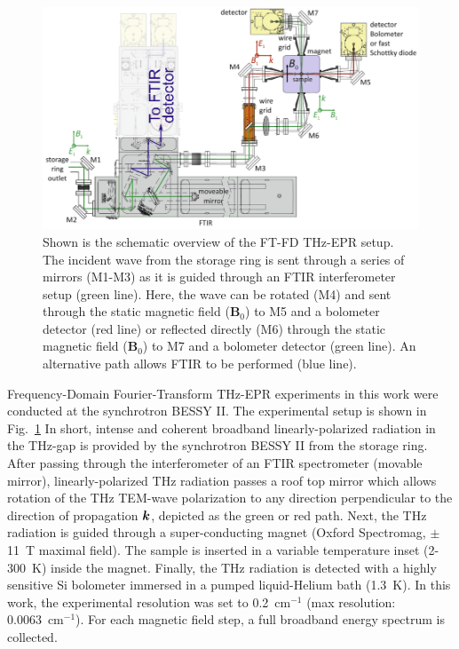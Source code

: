 \begin{figure}[htpb]
\centering
  \includegraphics{Kapitel/Ch4-Images/Ch4-ExperimentSetup.eps}%
  \caption[Schematic Overview of FT-FD THz-EPR setup.]{Shown is the schematic overview of the FT-FD THz-EPR setup. The incident wave from the storage ring is sent through a series of mirrors (M1-M3) as it is guided through an FTIR interferometer setup (green line). Here, the wave can be rotated (M4) and sent through the static magnetic field (\textbf{B}$_0$) to M5 and a bolometer detector (red line) or reflected directly (M6) through the static magnetic field (\textbf{B}$_0$) to M7 and a bolometer detector (green line). An alternative path allows FTIR to be performed (blue line).}
  \label{ch4-fig:ExFDFTSetup}
\end{figure}

Frequency-Domain Fourier-Transform THz-EPR experiments in this work were conducted at the synchrotron BESSY II. The experimental setup is shown in Fig.~\ref{ch4-fig:ExFDFTSetup} \cite{Schnegg09,Nehrkorn13,NEHRKORN201710} In short, intense and coherent broadband linearly-polarized radiation in the THz-gap is provided by the synchrotron BESSY II from the storage ring. \cite{AboBakr02} After passing through the interferometer of an FTIR spectrometer (movable mirror), linearly-polarized THz radiation passes a roof top mirror which allows rotation of the THz TEM-wave polarization to any direction perpendicular to the direction of propagation $\boldsymbol{k}$, depicted as the green or red path. Next, the THz radiation is guided through a super-conducting magnet (Oxford Spectromag, $\pm$11~T maximal field). The sample is inserted in a variable temperature inset (2-300~K) inside the magnet. Finally, the THz radiation is detected with a highly sensitive Si bolometer immersed in a pumped liquid-Helium bath (1.3~K). In this work, the experimental resolution was set to 0.2~cm$^{-1}$ (max resolution: 0.0063~cm$^{-1}$). For each magnetic field step, a full broadband energy spectrum is collected. 

